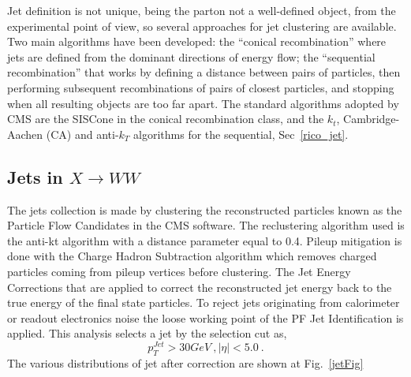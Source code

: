 Jet definition is not unique, being the parton not a well-defined object, from the experimental point of view, so several
approaches for jet clustering are available. Two main algorithms have been developed: the ``conical recombination''
where jets are defined from the dominant directions of energy flow; the ``sequential recombination'' that works by defining a distance
between pairs of particles, then performing subsequent recombinations of pairs of closest
particles, and stopping when all resulting objects are too far apart. The standard algorithms adopted by
CMS are the SISCone in the conical recombination class, and the $k_t$, Cambridge-Aachen (CA) and anti-$k_T$ algorithms for the sequential, Sec~\ref{rico_jet}.\\
\newline

\subsection*{Jets in $X \to WW$}
The jets collection is made by clustering the reconstructed particles known as the Particle Flow
Candidates in the CMS software. The reclustering algorithm used is the anti-kt algorithm with
a distance parameter equal to 0.4. Pileup mitigation is done with the Charge Hadron Subtraction  algorithm 
which removes charged particles coming from pileup vertices before
clustering.
The Jet Energy Corrections  that are applied to correct the reconstructed jet energy back
to the true energy of the final state particles.  To reject jets originating
from calorimeter or readout electronics noise the loose working point of the PF Jet Identification is applied. 
This analysis selects a jet by the selection cut as,
\begin{equation}
 p_T^{Jet} > 30 GeV \: , |\eta| < 5.0 \: .
\end{equation}
The various distributions of jet after correction are shown at Fig.~\ref{jetFig}
